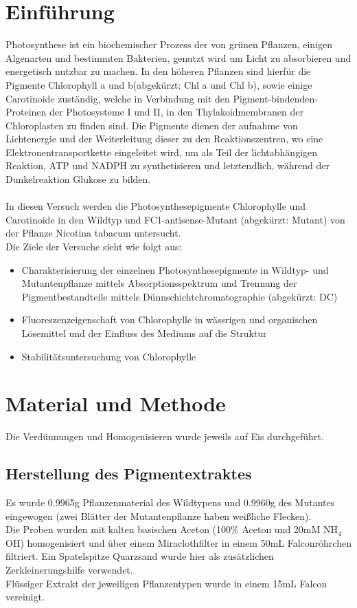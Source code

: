 \documentclass[10pt,a4paper]{article}
\begin{document}
	\section{Einführung}
	Photosynthese ist ein biochemischer Prozess der von grünen Pflanzen, einigen Algenarten und bestimmten Bakterien, genutzt wird um Licht zu absorbieren und energetisch nutzbar zu machen. In den höheren Pflanzen sind hierfür die Pigmente Chlorophyll a und b(abgekürzt: Chl a und Chl b), sowie  einige Carotinoide zuständig, welche in Verbindung mit den Pigment-bindenden-Proteinen der Photosysteme I und II, in den Thylakoidmembranen der Chloroplasten zu finden sind. Die Pigmente dienen der aufnahme von Lichtenergie und der Weiterleitung dieser zu den Reaktionszentren, wo eine Elektronentransportkette eingeleitet wird, um als Teil der lichtabhängigen Reaktion, ATP und NADPH zu synthetisieren und letztendlich, während der Dunkelreaktion Glukose zu bilden.\\
	\\
	In diesen Versuch werden die Photosynthesepigmente Chlorophylle und Carotinoide in den Wildtyp und FC1-antisense-Mutant (abgekürzt: Mutant) von der Pflanze Nicotina tabacum untersucht.\\
	Die Ziele der Versuche sieht wie folgt aus:
	
	\begin{itemize}
		\item Charakterisierung der einzelnen Photosynthesepigmente in Wildtyp- und Mutantenpflanze mittels Absorptionsspektrum und Trennung der Pigmentbestandteile mittels Dünnschichtchromatographie (abgekürzt: DC)
		\item  Fluoreszenzeigenschaft von Chlorophylle in wässrigen und organischen Lösemittel und der Einfluss des Mediums auf die Struktur
		\item Stabilitätsuntersuchung von Chlorophylle
	\end{itemize}
	
	
	\section{Material und Methode}
	Die Verdünnungen und Homogenisieren wurde jeweils auf Eis durchgeführt.
		\subsection{Herstellung des Pigmentextraktes}
		Es wurde 0.9965g Pflanzenmaterial des Wildtypens und 0.9960g des Mutantes eingewogen (zwei Blätter der Mutantenpflanze haben weißliche Flecken).\\
		Die Proben wurden mit kalten basischen Aceton (100$\%$ Aceton und 20mM NH$_4$OH) homogenisiert und über einem Miraclothfilter in einem 50mL Falconröhrchen filtriert. Ein Spatelspitze Quarzsand wurde hier als zusätzlichen Zerkleinerungshilfe verwendet.\\
		Flüssiger Extrakt der jeweiligen Pflanzentypen wurde in einem 15mL Falcon vereinigt.
		
\end{document}
